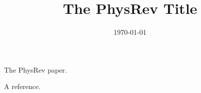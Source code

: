 \documentclass[aps,prl,showpacs,showkeys,amsmath,amssymb,twocolumn,floatfix,superscriptaddress]{revtex4-1}
\begin{document}
\title{The PhysRev Title}



%
\date{\today}

\begin{abstract}
\end{abstract}

\maketitle

The PhysRev paper.

A reference.~\cite{Ahmad:2001an} 

 

\end{document}
